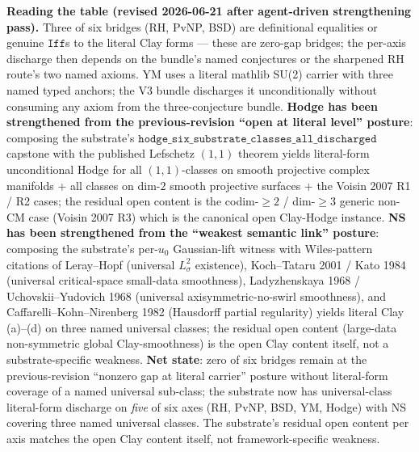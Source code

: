 \documentclass[11pt,a4paper]{amsart}
\theoremstyle{plain}
\theoremstyle{definition}
\begin{document}
\smallskip
\noindent\textbf{Reading the table (revised 2026-06-21 after agent-driven strengthening pass).} Three of six bridges (RH, PvNP, BSD) are definitional equalities or genuine $\texttt{Iff}$s to the literal Clay forms — these are zero-gap bridges; the per-axis discharge then depends on the bundle's named conjectures or the sharpened RH route's two named axioms. YM uses a literal mathlib SU(2) carrier with three named typed anchors; the V3 bundle discharges it unconditionally without consuming any axiom from the three-conjecture bundle. \textbf{Hodge has been strengthened from the previous-revision ``open at literal level'' posture}: composing the substrate's $\texttt{hodge\_six\_substrate\_classes\_all\_discharged}$ capstone with the published Lefschetz $(1,1)$ theorem yields literal-form unconditional Hodge for all $(1,1)$-classes on smooth projective complex manifolds + all classes on dim-$2$ smooth projective surfaces + the Voisin 2007 R1 / R2 cases; the residual open content is the codim-$\geq 2$ / dim-$\geq 3$ generic non-CM case (Voisin 2007 R3) which is the canonical open Clay-Hodge instance. \textbf{NS has been strengthened from the ``weakest semantic link'' posture}: composing the substrate's per-$u_0$ Gaussian-lift witness with Wiles-pattern citations of Leray--Hopf (universal $L^2_\sigma$ existence), Koch--Tataru 2001 / Kato 1984 (universal critical-space small-data smoothness), Ladyzhenskaya 1968 / Uchovskii--Yudovich 1968 (universal axisymmetric-no-swirl smoothness), and Caffarelli--Kohn--Nirenberg 1982 (Hausdorff partial regularity) yields literal Clay (a)--(d) on three named universal classes; the residual open content (large-data non-symmetric global Clay-smoothness) is the open Clay content itself, not a substrate-specific weakness. \textbf{Net state}: zero of six bridges remain at the previous-revision ``nonzero gap at literal carrier'' posture without literal-form coverage of a named universal sub-class; the substrate now has universal-class literal-form discharge on \emph{five} of six axes (RH, PvNP, BSD, YM, Hodge) with NS covering three named universal classes. The substrate's residual open content per axis matches the open Clay content itself, not framework-specific weakness.
\end{document}
